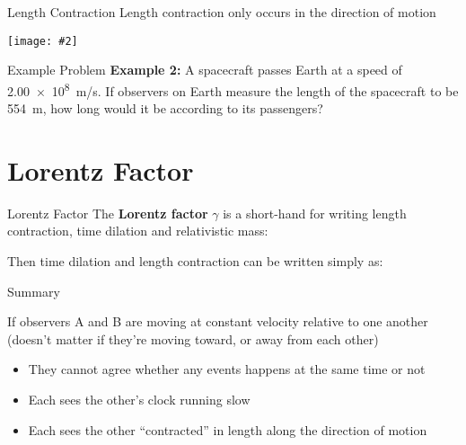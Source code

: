 \documentclass[12pt,compress,aspectratio=169]{beamer}
\newcommand{\pic}[2]{\texttt{[image: \#2]}}
\newcommand{\bigsqrt}{\ensuremath\sqrt{1-\left(\frac{v}{c}\right)^2}}
\newcommand{\lorentz}{\ensuremath\frac{1}{\bigsqrt}}
\newcommand{\eq}[2]{\vspace{#1}{\Large\begin{displaymath}#2\end{displaymath}}}
\begin{document}
\begin{frame}{Length Contraction}
  Length contraction only occurs in the direction of motion
  \begin{center}
    \pic{.8}{graphics/baseball-contraction}
    \end{center}
\end{frame}

\begin{frame}{Example Problem}
  \textbf{Example 2:} A spacecraft passes Earth at a speed of \SI{2.00e8}{m/s}.
  If observers on Earth measure the length of the spacecraft to be
  \SI{554}{\metre}, how long would it be according to its passengers?
\end{frame}


\section{Lorentz Factor}

\begin{frame}{Lorentz Factor}
  The \textbf{Lorentz factor} $\gamma$ is a short-hand for writing length
  contraction, time dilation and relativistic mass:

  \eq{-.2in}{
    \boxed{\gamma=\lorentz}
  }
  
  Then time dilation and length contraction can be written simply as:
  
  \eq{-.1in}{
    \boxed{t' = \gamma t}\quad\boxed{L' = \frac{L}{\gamma}}
  }
\end{frame}


\begin{frame}{Summary}
  \begin{center}
  \end{center}
  If observers A and B are moving at constant velocity relative to one another
  (doesn't matter if they're moving toward, or away from each other)
  \begin{itemize}
  \item They cannot agree whether any events happens at the same time or not
  \item Each sees the other's clock running slow
  \item Each sees the other ``contracted'' in length along the direction of
    motion
  \end{itemize}
\end{frame}
\end{document}
